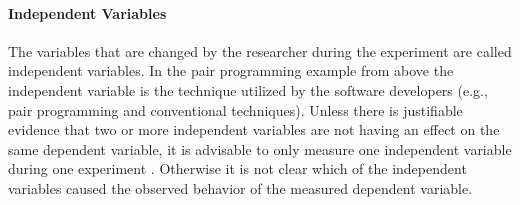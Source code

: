 
\paragraph{Independent Variables}

The variables that are changed by the researcher during the experiment are called independent variables. In the pair programming example from above  the independent variable is the technique utilized by the software developers (e.g., pair programming and conventional techniques). Unless there is justifiable evidence that two or more independent variables are not having an effect on the same dependent variable, it is advisable to only measure one independent variable during one experiment \cite{BuddiesVariables}. Otherwise it is not clear which of the independent variables caused the observed behavior of the measured dependent variable. 